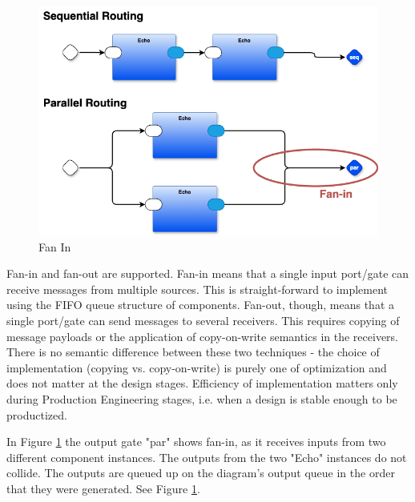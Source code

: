 \documentclass[10pt,anonymous,review]{acmart}
\begin{document}
  \begin{figure}
    \includegraphics[scale=0.2]{./media/fanin.png}
    \caption{Fan In}
    \label{fanin}
  \end{figure}

Fan-in and fan-out are supported. Fan-in means that a single input port/gate can receive messages from multiple sources. This is straight-forward to implement using the FIFO queue structure of components. Fan-out, though, means that a single port/gate can send messages to several receivers. This requires copying of message payloads or the application of copy-on-write semantics in the receivers. There is no semantic difference between these two techniques - the choice of implementation (copying vs. copy-on-write) is purely one of optimization and does not matter at the design stages. Efficiency of implementation matters only during Production Engineering stages, i.e. when a design is stable enough to be productized.

In Figure \ref{fanin} the output gate "par" shows fan-in, as it receives inputs from two different component instances. The outputs from the two "Echo" instances do not collide. The outputs are queued up on the diagram's output queue in the order that they were generated. See Figure \ref{fanin}.
\end{document}
